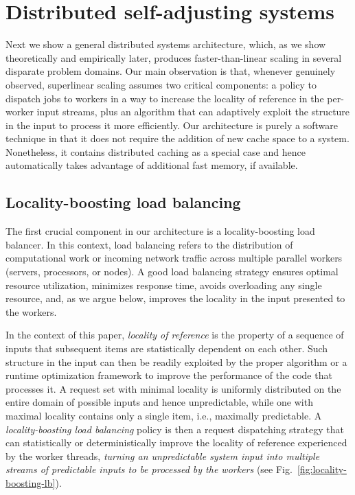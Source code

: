 \section{Distributed self-adjusting systems}
\label{sec:architecture}

Next we show a general distributed systems architecture, which, as we show theoretically and empirically later, produces faster-than-linear scaling in several disparate problem domains. Our main observation is that, whenever genuinely observed, superlinear scaling assumes two critical components: a policy to dispatch jobs to workers in a way to increase the locality of reference in the per-worker input streams, plus an algorithm that can adaptively exploit the structure in the input to process it more efficiently. Our architecture is purely a software technique in that it does not require the addition of new cache space to a system. Nonetheless, it contains distributed caching as a special case and hence automatically takes advantage of additional fast memory, if available.

\subsection{Locality-boosting load balancing}
\label{sec:lb-lb}

The first crucial component in our architecture is a locality-boosting load balancer.  In this context, load balancing refers to the distribution of computational work or incoming network traffic across multiple parallel workers (servers, processors, or nodes). A good load balancing strategy ensures optimal resource utilization, minimizes response time, avoids overloading any single resource, and, as we argue below, improves the locality in the input presented to the workers. 

In the context of this paper, \emph{locality of reference} is the property of a sequence of inputs that subsequent items are statistically dependent on each other. Such structure in the input can then be readily exploited by the proper algorithm \cite{SleatorT85Splay, BentleyCL93, HesterH85, HesterH85, BentleySTW86, Avin0020, ParkM12} or a runtime optimization framework \cite{276946,246322,10.1145/3503222.3507769,procieee_2019} to improve the performance of the code that processes it. A request set with minimal locality is uniformly distributed on the entire domain of possible inputs and hence unpredictable, while one with maximal locality contains only a single item, i.e., maximally predictable. A \emph{locality-boosting load balancing} policy is then a request dispatching strategy that can statistically or deterministically improve the locality of reference experienced by the worker threads, \emph{turning an unpredictable system input into multiple streams of predictable inputs to be processed by the workers} (see Fig.~\ref{fig:locality-boosting-lb}).

